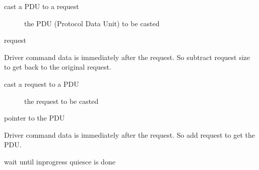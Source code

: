 \documentclass[a4paper,11pt,english]{sphinxmanual}
\begin{document}
\begin{fulllineitems}
\label{\detokenize{blk-mq:c.blk_mq_rq_from_pdu}}
cast a PDU to a request

\end{fulllineitems}


\begin{description}
\item[{}] \leavevmode
the PDU (Protocol Data Unit) to be casted

\end{description}


request


Driver command data is immediately after the request. So subtract request
size to get back to the original request.

\begin{fulllineitems}
\label{\detokenize{blk-mq:c.blk_mq_rq_to_pdu}}
cast a request to a PDU

\end{fulllineitems}


\begin{description}
\item[{}] \leavevmode
the request to be casted

\end{description}


pointer to the PDU


Driver command data is immediately after the request. So add request to get
the PDU.

\begin{fulllineitems}
\label{\detokenize{blk-mq:c.blk_mq_wait_quiesce_done}}
wait until in\sphinxhyphen{}progress quiesce is done

\end{fulllineitems}
\end{document}
